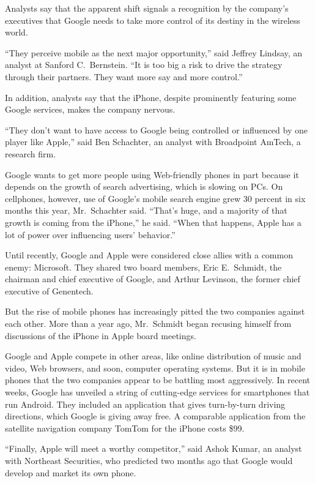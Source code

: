 ﻿\documentclass[12pt]{article}
\begin{document}
Analysts say that the apparent shift signals a recognition by the company's executives that Google
needs to take more control of its destiny in the wireless world.

``They perceive mobile as the next major opportunity,'' said Jeffrey Lindsay, an analyst at Sanford
C.~Bernstein. ``It is too big a risk to drive the strategy through their partners. They want more
say and more control.''

In addition, analysts say that the iPhone, despite prominently featuring some Google services, makes
the company nervous.

``They don't want to have access to Google being controlled or influenced by one player like
Apple,'' said Ben Schachter, an analyst with Broadpoint AmTech, a research firm.

Google wants to get more people using Web-friendly phones in part because it depends on the growth
of search advertising, which is slowing on PCs. On cellphones, however, use of Google's mobile
search engine grew 30 percent in six months this year, Mr.~Schachter said. ``That's huge, and a
majority of that growth is coming from the iPhone,'' he said. ``When that happens, Apple has a lot
of power over influencing users' behavior.''

Until recently, Google and Apple were considered close allies with a common enemy: Microsoft. They
shared two board members, Eric E.~Schmidt, the chairman and chief executive of Google, and Arthur
Levinson, the former chief executive of Genentech.

But the rise of mobile phones has increasingly pitted the two companies against each other. More
than a year ago, Mr.~Schmidt began recusing himself from discussions of the iPhone in Apple board
meetings.

Google and Apple compete in other areas, like online distribution of music and video, Web browsers,
and soon, computer operating systems. But it is in mobile phones that the two companies appear to be
battling most aggressively. In recent weeks, Google has unveiled a string of cutting-edge services
for smartphones that run Android. They included an application that gives turn-by-turn driving
directions, which Google is giving away free. A comparable application from the satellite navigation
company TomTom for the iPhone costs \$99.

``Finally, Apple will meet a worthy competitor,'' said Ashok Kumar, an analyst with Northeast
Securities, who predicted two months ago that Google would develop and market its own phone.
\end{document}
